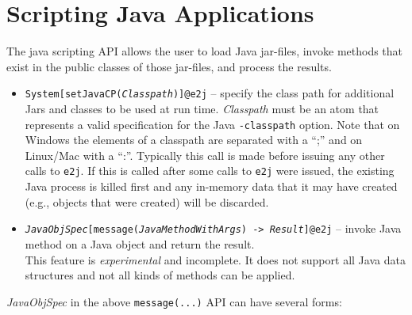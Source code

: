 \section{Scripting Java Applications}

The java scripting API allows the user to load Java jar-files, invoke
methods that exist in the public classes of those jar-files, and process
the results.

\begin{itemize}
\item \texttt{System[setJavaCP(\textnormal{\emph{Classpath}})]@\bs{}e2j} --
  specify the class path for additional Jars and classes to be used at run
  time. \emph{Classpath} must be an atom that represents a valid
  specification for the Java \texttt{-classpath} option.  Note that on
  Windows the elements of a classpath are separated with a ``;'' and on
  Linux/Mac with a ``:''.  Typically this call is made before issuing any
  other calls to \texttt{\bs{}e2j}.  If this is called after some calls to
  \texttt{\bs{}e2j} were issued, the existing Java process is killed first
  and any in-memory data that it may have
  created (e.g., objects that were created) will be discarded.
\item
  \texttt{\textnormal{\emph{JavaObjSpec}}[message(\textnormal{\emph{JavaMethodWithArgs}})
    -> \textnormal{\emph{Result}}]@\bs{}e2j} -- invoke Java method on a
  Java object and return the result.
  \\
  This feature is \emph{experimental} and incomplete. It does not support
  all Java data structures and not all kinds of methods can be applied. 
\end{itemize}
\emph{JavaObjSpec} in the above \texttt{message(...)}   API can have several forms:
